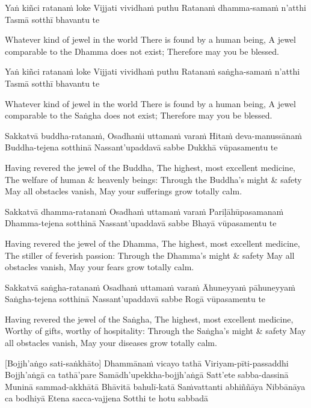 \begin{english}
\begin{english}
Yaṅ kiñci ratanaṁ loke
Vijjati vividhaṁ puthu
Ratanaṁ dhamma-samaṁ n’atthi
Tasmā sotthī bhavantu te

\begin{english}
Whatever kind of jewel in the world
There is found by a human being,
A jewel comparable to the Dhamma does not exist;
Therefore may you be blessed.
\end{english}

Yaṅ kiñci ratanaṁ loke
Vijjati vividhaṁ puthu
Ratanaṁ saṅgha-samaṁ n’atthi
Tasmā sotthī bhavantu te

\begin{english}
Whatever kind of jewel in the world
There is found by a human being,
A jewel comparable to the Saṅgha does not exist;
Therefore may you be blessed.
\end{english}

Sakkatvā buddha-ratanaṁ,
Osadhaṁi uttamaṁ varaṁ
Hitaṁ deva-manussānaṁ
Buddha-tejena sotthinā
Nassant’upaddavā sabbe
Dukkhā vūpasamentu te

\begin{english}
Having revered the jewel of the Buddha,
The highest, most excellent medicine,
The welfare of human \& heavenly beings:
Through the Buddha’s might \& safety
May all obstacles vanish,
May your sufferings grow totally calm.
\end{english}

Sakkatvā dhamma-ratanaṁ
Osadhaṁ uttamaṁ varaṁ
Pariḷāhūpasamanaṁ
Dhamma-tejena sotthinā
Nassant’upaddavā sabbe
Bhayā vūpasamentu te

\begin{english}
Having revered the jewel of the Dhamma,
The highest, most excellent medicine,
The stiller of feverish passion:
Through the Dhamma’s might & safety
May all obstacles vanish,
May your fears grow totally calm.
\end{english}

Sakkatvā saṅgha-ratanaṁ
Osadhaṁ uttamaṁ varaṁ
Āhuneyyaṁ pāhuneyyaṁ
Saṅgha-tejena sotthinā
Nassant’upaddavā sabbe
Rogā vūpasamentu te

\begin{english}
Having revered the jewel of the Saṅgha,
The highest, most excellent medicine,
Worthy of gifts, worthy of hospitality:
Through the Saṅgha’s might & safety
May all obstacles vanish,
May your diseases grow totally calm.
\end{english}

\suttaRef{[MJG]}

[Bojjh’aṅgo sati-saṅkhāto]
Dhammānaṁ vicayo tathā
Viriyam-pīti-passaddhi
Bojjh’aṅgā ca tathā’pare
Samādh’upekkha-bojjh’aṅgā
Satt’ete sabba-dassinā
Muninā sammad-akkhātā
Bhāvitā bahulī-katā
Saṁvattanti abhiññāya
Nibbānāya ca bodhiyā
Etena sacca-vajjena
Sotthi te hotu sabbadā


\end{english}
\end{english}
